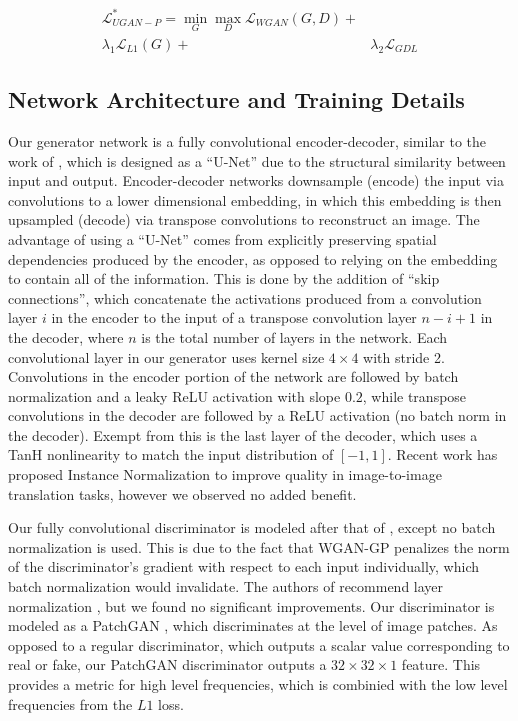 \documentclass[letterpaper, 10pt, conference]{ieeeconf}
\begin{document}
\begin{equation}
   \begin{aligned}
      \mathcal{L}_{UGAN-P}^* = \min\limits_{G}\max\limits_{D} \mathcal{L}_{WGAN}(G,D) + & \\
      \lambda_{1} \mathcal{L}_{L1}(G) + & \lambda_{2} \mathcal{L}_{GDL}
   \end{aligned}
\end{equation}


\subsection{Network Architecture and Training Details}
Our generator network is a fully convolutional encoder-decoder, similar to the work of \cite{isola2016image}, which is
designed as a ``U-Net'' \cite{ronneberger2015u} due to the structural similarity between input and output.
Encoder-decoder networks downsample (encode) the input via convolutions to a lower dimensional embedding, in which
this embedding is then upsampled (decode) via transpose convolutions to reconstruct an image. The advantage of using
a ``U-Net'' comes from explicitly preserving spatial dependencies produced by the encoder, as opposed to relying on the
embedding to contain all of the information. This is done by the addition of ``skip connections'', which concatenate
the activations produced from a convolution layer $i$ in the encoder to the input of a transpose convolution layer
$n-i+1$ in the decoder, where $n$ is the total number of layers in the network. Each convolutional layer in our
generator uses kernel size $4 \times 4$ with stride 2. Convolutions in the encoder portion of the network are followed
by batch normalization \cite{pmlr-v37-ioffe15} and a leaky ReLU activation with slope $0.2$, while transpose
convolutions in the decoder are followed by a ReLU activation \cite{nair2010rectified} (no batch norm in the decoder).
Exempt from this is the last layer of the decoder, which uses a TanH nonlinearity to match the input distribution of
$[-1, 1]$. Recent work has proposed Instance Normalization \cite{ulyanov2016instance} to improve quality
in image-to-image translation tasks, however we observed no added benefit.

Our fully convolutional discriminator is modeled after that of \cite{radford2015unsupervised}, except no batch
normalization is used. This is due to the fact that WGAN-GP penalizes the norm of the discriminator's gradient with
respect to each input individually, which batch normalization would invalidate. The authors of
\cite{gulrajani2017improved} recommend layer normalization \cite{ba2016layer}, but we found no significant improvements.
Our discriminator is modeled as a PatchGAN \cite{isola2016image,li2016precomputed,}, which discriminates at the level of
image patches. As opposed to a regular discriminator, which outputs a scalar value corresponding to real or fake, our
PatchGAN discriminator outputs a $32 \times 32 \times 1$ feature. This provides a metric for high level frequencies,
which is combinied with the low level frequencies from the $L1$ loss.
\end{document}
